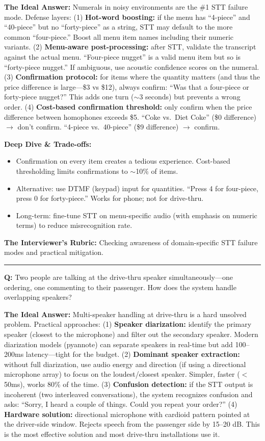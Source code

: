 \textbf{The Ideal Answer:} Numerals in noisy environments are the \#1 STT failure mode. Defense layers: (1) \textbf{Hot-word boosting:} if the menu has ``4-piece'' and ``40-piece'' but no ``forty-piece'' as a string, STT may default to the more common ``four-piece.'' Boost all menu item names including their numeric variants. (2) \textbf{Menu-aware post-processing:} after STT, validate the transcript against the actual menu. ``Four-piece nugget'' is a valid menu item but so is ``forty-piece nugget.'' If ambiguous, use acoustic confidence scores on the numeral. (3) \textbf{Confirmation protocol:} for items where the quantity matters (and thus the price difference is large---\$3 vs \$12), always confirm: ``Was that a four-piece or forty-piece nugget?'' This adds one turn ($\sim$3 seconds) but prevents a wrong order. (4) \textbf{Cost-based confirmation threshold:} only confirm when the price difference between homophones exceeds \$5. ``Coke vs.\ Diet Coke'' (\$0 difference) $\rightarrow$ don't confirm. ``4-piece vs.\ 40-piece'' (\$9 difference) $\rightarrow$ confirm.

\textbf{Deep Dive \& Trade-offs:}
\begin{itemize}
  \item Confirmation on every item creates a tedious experience. Cost-based thresholding limits confirmations to $\sim$10\% of items.
  \item Alternative: use DTMF (keypad) input for quantities. ``Press 4 for four-piece, press 0 for forty-piece.'' Works for phone; not for drive-thru.
  \item Long-term: fine-tune STT on menu-specific audio (with emphasis on numeric terms) to reduce misrecognition rate.
\end{itemize}

\textbf{The Interviewer's Rubric:} Checking awareness of domain-specific STT failure modes and practical mitigation.

\bigskip\hrule\bigskip

\textbf{Q:} Two people are talking at the drive-thru speaker simultaneously---one ordering, one commenting to their passenger. How does the system handle overlapping speakers?

\textbf{The Ideal Answer:} Multi-speaker handling at drive-thru is a hard unsolved problem. Practical approaches: (1) \textbf{Speaker diarization:} identify the primary speaker (closest to the microphone) and filter out the secondary speaker. Modern diarization models (pyannote) can separate speakers in real-time but add 100--200ms latency---tight for the budget. (2) \textbf{Dominant speaker extraction:} without full diarization, use audio energy and direction (if using a directional microphone array) to focus on the loudest/closest speaker. Simpler, faster ($<$50ms), works 80\% of the time. (3) \textbf{Confusion detection:} if the STT output is incoherent (two interleaved conversations), the system recognizes confusion and asks: ``Sorry, I heard a couple of things. Could you repeat your order?'' (4) \textbf{Hardware solution:} directional microphone with cardioid pattern pointed at the driver-side window. Rejects speech from the passenger side by 15--20 dB. This is the most effective solution and most drive-thru installations use it.

